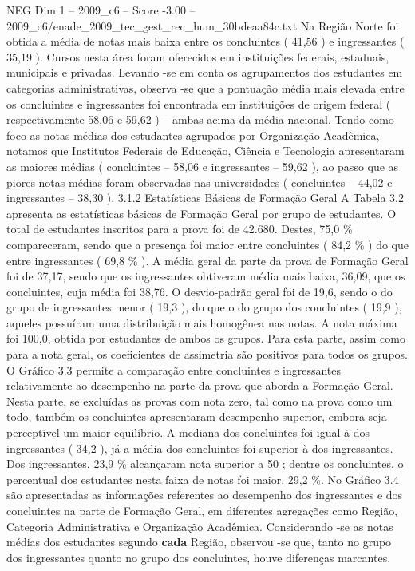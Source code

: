 \begin{textsample}{NEG Dim 1 – 2009\_c6 – Score -3.00 – 2009\_c6/enade\_2009\_tec\_gest\_rec\_hum\_30bdeaa84c.txt}
Na Região Norte foi obtida a média de notas mais baixa entre os concluintes ( 41,56 ) e ingressantes ( 35,19 ).
Cursos nesta área foram oferecidos em instituições federais, estaduais, municipais e privadas.
Levando -se em conta os agrupamentos dos estudantes em categorias administrativas, observa -se que a pontuação média mais elevada entre os concluintes e ingressantes foi encontrada em instituições de origem federal ( respectivamente 58,06 e 59,62 ) – ambas acima da média nacional.
Tendo como foco as notas médias dos estudantes agrupados por Organização Acadêmica, notamos que Institutos Federais de Educação, Ciência e Tecnologia apresentaram as maiores médias ( concluintes – 58,06 e ingressantes – 59,62 ), ao passo que as piores notas médias foram observadas nas universidades ( concluintes – 44,02 e ingressantes – 38,30 ). 3.1.2 Estatísticas Básicas de Formação Geral A Tabela 3.2 apresenta as estatísticas básicas de Formação Geral por grupo de estudantes.
O total de estudantes inscritos para a prova foi de 42.680.
Destes, 75,0 \% compareceram, sendo que a presença foi maior entre concluintes ( 84,2 \% ) do que entre ingressantes ( 69,8 \% ).
A média geral da parte da prova de Formação Geral foi de 37,17, sendo que os ingressantes obtiveram média mais baixa, 36,09, que os concluintes, cuja média foi 38,76.
O desvio-padrão geral foi de 19,6, sendo o do grupo de ingressantes menor ( 19,3 ), do que o do grupo dos concluintes ( 19,9 ), aqueles possuíram uma distribuição mais homogênea nas notas.
A nota máxima foi 100,0, obtida por estudantes de ambos os grupos.
Para esta parte, assim como para a nota geral, os coeficientes de assimetria são positivos para todos os grupos.
O Gráfico 3.3 permite a comparação entre concluintes e ingressantes relativamente ao desempenho na parte da prova que aborda a Formação Geral.
Nesta parte, se excluídas as provas com nota zero, tal como na prova como um todo, também os concluintes apresentaram desempenho superior, embora seja perceptível um maior equilíbrio.
A mediana dos concluintes foi igual à dos ingressantes ( 34,2 ), já a média dos concluintes foi superior à dos ingressantes.
Dos ingressantes, 23,9 \% alcançaram nota superior a 50 ; dentre os concluintes, o percentual dos estudantes nesta faixa de notas foi maior, 29,2 \%.
No Gráfico 3.4 são apresentadas as informações referentes ao desempenho dos ingressantes e dos concluintes na parte de Formação Geral, em diferentes agregações como Região, Categoria Administrativa e Organização Acadêmica.
Considerando -se as notas médias dos estudantes segundo \textbf{cada} Região, observou -se que, tanto no grupo dos ingressantes quanto no grupo dos concluintes, houve diferenças marcantes.

\end{textsample}
